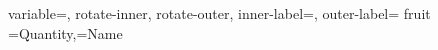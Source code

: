 \documentclass[12pt]{article}
\begin{document}
\DTLpiechart
{
 variable=\Quantity,
 rotate-inner,
 rotate-outer,
 inner-label=\DTLpiepercent,
 outer-label=\Name
}
{fruit}%
{\Quantity=Quantity,\Name=Name} 
\end{document}
